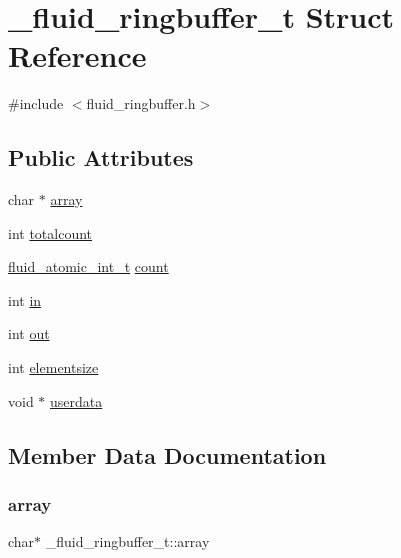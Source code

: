 \hypertarget{struct__fluid__ringbuffer__t}{}\section{\+\_\+fluid\+\_\+ringbuffer\+\_\+t Struct Reference}
\label{struct__fluid__ringbuffer__t}


{\ttfamily \#include $<$fluid\+\_\+ringbuffer.\+h$>$}

\subsection*{Public Attributes}
\begin{DoxyCompactItemize}
\item 
char $\ast$ \hyperlink{struct__fluid__ringbuffer__t_a8a3c1a78adee3a690fa0506933a9c528}{array}
\item 
int \hyperlink{struct__fluid__ringbuffer__t_a3f705c52b05143c4b280a6b97b5786cb}{totalcount}
\item 
\hyperlink{fluidsynth__priv_8h_a6b8be882dd9958ea3635a868e1bf5152}{fluid\+\_\+atomic\+\_\+int\+\_\+t} \hyperlink{struct__fluid__ringbuffer__t_afb516fac54145dfb5368d6423ffeefe5}{count}
\item 
int \hyperlink{struct__fluid__ringbuffer__t_a7bbee19f1dfb2610f5aeacd6072034a4}{in}
\item 
int \hyperlink{struct__fluid__ringbuffer__t_a924348bac086f4b2fae906fefe8641ca}{out}
\item 
int \hyperlink{struct__fluid__ringbuffer__t_a47c6d0a36b568068c73dfae1953df03d}{elementsize}
\item 
void $\ast$ \hyperlink{struct__fluid__ringbuffer__t_a6f77ab4788fa1cefa502a70e77b27ac1}{userdata}
\end{DoxyCompactItemize}


\subsection{Member Data Documentation}
\mbox{\label{struct__fluid__ringbuffer__t_a8a3c1a78adee3a690fa0506933a9c528}} 
\subsubsection{\texorpdfstring{array}{array}}
{\footnotesize\ttfamily char$\ast$ \+\_\+fluid\+\_\+ringbuffer\+\_\+t\+::array}

